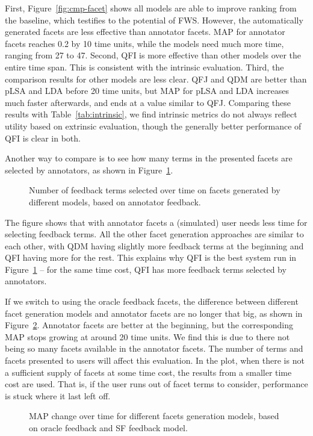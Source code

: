 First, Figure~\ref{fig:cmp-facet} shows all models are able to improve ranking from the baseline, which testifies to the potential of FWS. However, the automatically generated facets are less effective than annotator facets. MAP for annotator facets reaches 0.2 by 10 time units, while the models need much more time, ranging from 27 to 47. Second, QFI is more effective than other models over the entire time span. This is consistent with the intrinsic evaluation. Third, the comparison results for other models are less clear. QFJ and QDM are better than pLSA and LDA before 20 time units, but MAP for pLSA and LDA increases much faster afterwards, and ends at a value similar to QFJ. Comparing these results with Table~\ref{tab:intrinsic}, we find intrinsic metrics do not always reflect utility based on extrinsic evaluation, though the generally better performance of QFI is clear in both.

Another way to compare is to see how many terms in the presented facets are selected by annotators, as shown in Figure~\ref{fig:cmp-facet-term}.
\begin{figure}[!ht]
\centering
{}
\caption{Number of feedback terms selected over time on facets generated by different models, based on annotator feedback.}
\label{fig:cmp-facet-term}
\end{figure}
The figure shows that with annotator facets a (simulated) user needs less time for selecting feedback terms. All the other facet generation approaches are similar to each other, with QDM having slightly more feedback terms at the beginning and QFI having more for the rest. This explains why QFI is the best system run in Figure~\ref{fig:cmp-facet-term} -- for the same time cost, QFI has more feedback terms selected by annotators.

If we switch to using the oracle feedback facets, the difference between different facet generation models and annotator facets are no longer that big, as shown in Figure~\ref{fig:cmp-facet-oracle}. Annotator facets are better at the beginning, but the corresponding MAP stops growing at around 20 time units. We find this is due to there not being so many facets available in the annotator facets. The number of terms and facets presented to users will affect this evaluation. In the plot, when there is not a sufficient supply of facets at some time cost, the results from a smaller time cost are used. That is, if the user runs out of facet terms to consider, performance is stuck where it last left off. 
\begin{figure}[!ht]
\centering
{}
\caption{MAP change over time for different facets generation models, based on oracle feedback and SF feedback model.}
\label{fig:cmp-facet-oracle}
\end{figure}

